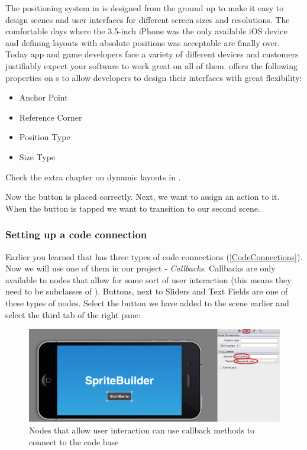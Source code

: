 \begin{details}[frametitle={Positioning System in \cocos{} and \SB{}}] 
The positioning system in \cocos{} is designed from the ground up to make it
easy to design scenes and user interfaces for different screen sizes and
resolutions. The comfortable days where the 3.5-inch iPhone was the only 
available iOS device and defining layouts with absolute positions was acceptable
are finally over. Today app and game developers face a variety of different
devices and customers justifiably expect your software to work great on all of
them. \cocos{} offers the following properties on \ccnode{}s to allow developers
to design their interfaces with great flexibility:

\begin{itemize}
  \item Anchor Point
  \item Reference Corner
  \item Position Type
  \item Size Type
\end{itemize}

Check the extra chapter on dynamic layouts in \SB{}. %

\end{details}

Now the button is placed correctly. Next, we want to assign an action to it.
When the button is tapped we want to transition to our second scene.

\subsubsection{Setting up a code connection}

Earlier you learned that \SB{} has three types of code connections 
(\ref{CodeConnections}). Now we will use one of them in our project -
\textit{Callbacks}. Callbacks are only
available to nodes that allow for some sort of user interaction (this means they need to be subclasses of
). Buttons, next to Sliders and Text Fields are one of
these types of nodes. Select the button we have added to the scene earlier and
select the third tab of the right pane:

\begin{figure}[H]
		\centering
		\includegraphics[width=0.9\linewidth]{images/firstproject/button_callback.png}
		\caption{Nodes that allow user interaction can use callback methods to
		connect to the code base}
\end{figure}

